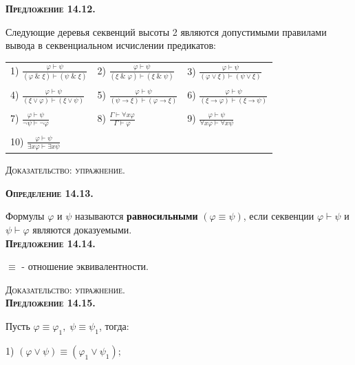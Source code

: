 \documentclass[18pt, a4paper]{extarticle}
\newcommand{\ampersand}{\;\&\;}
\newcommand{\Gm}{\Gamma}
\begin{document}
\textbf{\textsc{Предложение 14.12.}} 

Следующие деревья секвенций высоты 2 являются допустимыми правилами вывода в секвенциальном исчислении предикатов:

\begin{tabular}{lll}
1) $\displaystyle \frac{\varphi\vdash\psi}{(\varphi\ampersand\xi)\vdash(\psi\ampersand\xi)}$ & 2) $\displaystyle \frac{\varphi\vdash\psi}{(\xi\ampersand\varphi)\vdash(\xi\ampersand\psi)}$ & 3) $\displaystyle \frac{\varphi\vdash\psi}{(\varphi\vee\xi)\vdash(\psi\vee\xi)}$\\\\

4) $\displaystyle \frac{\varphi\vdash\psi}{(\xi\vee\varphi)\vdash(\xi\vee\psi)}$ & 5) $\displaystyle \frac{\varphi\vdash\psi}{(\psi\to\xi)\vdash(\varphi\to\xi)}$ & 6) $\displaystyle \frac{\varphi\vdash\psi}{(\xi\to\varphi)\vdash(\xi\to\psi)}$\\\\

7) $\displaystyle \frac{\varphi\vdash\psi}{\lnot\psi\vdash\lnot\varphi}$ & 8) $\displaystyle \frac{\Gm\vdash\forall x\varphi}{\Gm\vdash\varphi}$ & 9) $\displaystyle \frac{\varphi\vdash\psi}{\forall x\varphi\vdash\forall x\psi}$\\\\

10) $\displaystyle \frac{\varphi\vdash\psi}{\exists x\varphi\vdash\exists x\psi}$ &  & 
\end{tabular}\vspace{3mm}

\textsc{Доказательство: упражнение.}

\textbf{\textsc{Определение 14.13.}} 

Формулы $\varphi$ и $\psi$ называются \textbf{равносильными} $(\varphi\equiv\psi)$, если секвенции $\varphi\vdash\psi$ и $\psi\vdash\varphi$ являются доказуемыми.\\

\textbf{\textsc{Предложение 14.14.}} 

$\equiv$ -  отношение эквивалентности.

\textsc{Доказательство: упражнение.}\\

\textbf{\textsc{Предложение 14.15.}} 

Пусть $\varphi\equiv\varphi_1,\;\psi\equiv\psi_1$, тогда:

1) $(\varphi\vee\psi)\equiv(\varphi_1\vee\psi_1);$
\end{document}
